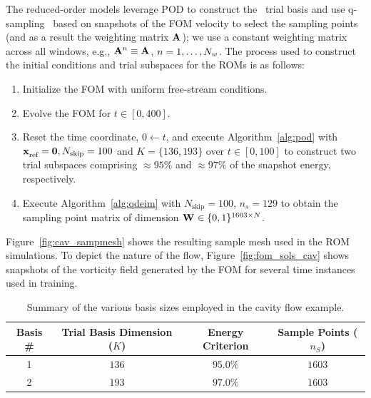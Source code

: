 The reduced-order models leverage POD to construct the \spatialAcronym\ trial basis and use q-sampling~\cite{qdeim_drmac} based on snapshots of the FOM velocity to select the sampling points (and as a result the weighting 
matrix $\mathbf{A}^{}$); we use a constant weighting matrix across all windows, e.g., $\mathbf{A}^{n} \equiv \mathbf{A}^{}$, $n=1,\ldots,N_w$. The process used to construct the initial conditions and trial subspaces for the ROMs is as follows:
\begin{enumerate}
\item Initialize the FOM with uniform free-stream conditions.
\item Evolve the FOM for $t \in [0,400]$.
\item Reset the time coordinate, $0 \leftarrow t$, and execute Algorithm~\ref{alg:pod} with $\mathbf{x}_\text{ref}^{} = \boldsymbol 0, N_{\text{skip}} = 100$ and $K = \{136,193\}$ over $t \in [0,100]$ to construct two trial subspaces comprising $\approx 95\%$ and $\approx 97\%$ of the snapshot energy, respectively. 
\item Execute Algorithm~\ref{alg:qdeim} with $N_{\text{skip}} = 100$, $n_s = 129$ to obtain the sampling point matrix of dimension $\mathbf{W}^{} \in \{0,1\}^{1603 \times N }$. 
\end{enumerate}
Figure~\ref{fig:cav_sampmesh} shows the resulting sample mesh used in the ROM simulations. To depict the nature of the flow, Figure~\ref{fig:fom_sols_cav} shows snapshots of the vorticity field generated by the FOM for several time instances used in training.  
\begin{table}[]
\begin{centering}
\begin{tabular}{c c c c}
\hline
Basis \# & Trial Basis Dimension ($K$) &  Energy Criterion & Sample Points ($n_S$) \\
\hline
1    & $136$ & $95.0\%$ & $1603$ \\
2    & $193$ & $97.0\%$ & $1603$ \\
\hline
\end{tabular}
\caption{Summary of the various basis sizes employed in the cavity flow example.}
\label{tab:rom_basis_details}
\end{centering}
\end{table}

